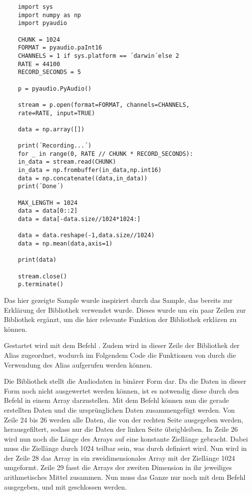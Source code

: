 \begin{verbatim}
    import sys
    import numpy as np
    import pyaudio
    
    CHUNK = 1024
    FORMAT = pyaudio.paInt16
    CHANNELS = 1 if sys.platform == ´darwin´else 2
    RATE = 44100
    RECORD_SECONDS = 5
    
    p = pyaudio.PyAudio()
    
    stream = p.open(format=FORMAT, channels=CHANNELS,
    rate=RATE, input=TRUE)
    
    data = np.array([])
    
    print(´Recording...´)
    for _ in range(0, RATE // CHUNK * RECORD_SECONDS):
    in_data = stream.read(CHUNK)
    in_data = np.frombuffer(in_data,np.int16)
    data = np.concatenate((data,in_data))
    print(´Done´)
    
    MAX_LENGTH = 1024
    data = data[0::2]
    data = data[-data.size//1024*1024:]
    
    data = data.reshape(-1,data.size//1024)
    data = np.mean(data,axis=1)
    
    print(data)
    
    stream.close()
    p.terminate()
\end{verbatim}

Das hier gezeigte Sample wurde inspiriert durch das Sample, das bereits zur Erklärung der Bibliothek  verwendet wurde. Dieses wurde um ein paar Zeilen zur Bibliothek  ergänzt, um die hier relevante Funktion der Bibliothek erklären zu können.  

Gestartet wird mit dem Befehl . Zudem wird in dieser Zeile der Bibliothek der Alias  zugeordnet, wodurch im Folgendem Code die Funktionen von  durch die Verwendung des Alias aufgerufen werden können.  

Die Bibliothek  stellt die Audiodaten in binärer Form dar. Da die Daten in dieser Form noch nicht ausgewertet werden können, ist es notwendig diese durch den Befehl  in einem Array darzustellen. Mit dem Befehl  können nun die gerade erstellten Daten und die ursprünglichen Daten zusammengefügt werden. Von Zeile 24 bis 26 werden alle Daten, die von der rechten Seite ausgegeben werden, herausgefiltert, sodass nur die Daten der linken Seite übrigbleiben. In Zeile 26 wird nun noch die Länge des Arrays auf eine konstante  Ziellänge gebracht. Dabei muss die Ziellänge durch 1024 teilbar sein, was durch  definiert wird. Nun wird in der Zeile 28 das Array in ein zweidimensionales Array mit der Ziellänge 1024 umgeformt. Zeile 29 fasst die Arrays der zweiten Dimension in ihr jeweiliges arithmetisches Mittel zusammen. Nun muss das Ganze nur noch mit dem Befehl  ausgegeben, und mit  geschlossen werden. \cite{Numpy:2022}

